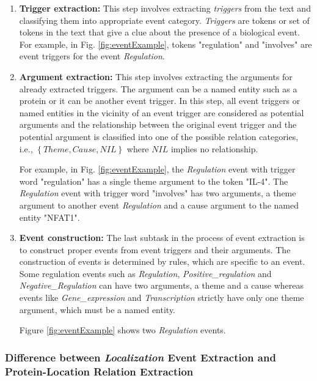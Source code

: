 \begin{enumerate}

\item \textbf{Trigger extraction:} This step involves extracting \textit{triggers} from the text and classifying them into appropriate event category. \textit{Triggers} are tokens or set of tokens in the text that give a clue about the presence of a biological event. For example, in Fig. \ref{fig:eventExample}, tokens "regulation" and "involves" are event triggers for the event \textit{Regulation}.

\item \textbf{Argument extraction: } This step involves extracting the arguments for already extracted triggers. The argument can be a named entity such as a protein or it can be another event trigger. In this step, all event triggers or named entities in the vicinity of an event trigger are considered as potential arguments and the relationship between the original event trigger and the potential argument is classified into one of the possible relation categories, i.e., $\left\lbrace Theme, Cause, NIL \right\rbrace$ where $NIL$ implies no relationship.

For example, in Fig. \ref{fig:eventExample}, the \textit{Regulation} event with trigger word "regulation" has a single theme argument to the token "IL-4". The \textit{Regulation} event with trigger word "involves" has two arguments, a theme argument to another event \textit{Regulation} and a cause argument to the named entity "NFAT1".

\item \textbf{Event construction: }  The last subtask in the process of event extraction is to construct proper events from event triggers and their arguments. The construction of events is determined by rules, which are specific to an event. Some regulation events such as \textit{Regulation}, \textit{Positive\_regulation} and \textit{Negative\_Regulation} can have two arguments, a theme and a cause whereas events like \textit{Gene\_expression} and \textit{Transcription} strictly have only one theme argument, which must be a named entity.

Figure \ref{fig:eventExample} shows two \textit{Regulation} events.

\end{enumerate}

\subsubsection{Difference between \textit{Localization} Event Extraction and Protein-Location Relation Extraction}


